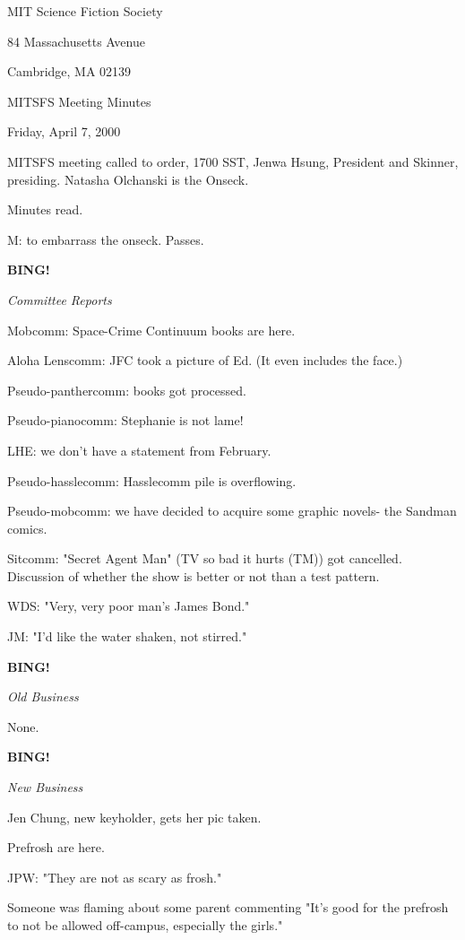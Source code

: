 \documentclass[12pt]{article}
\newcommand{\bing}{{\bf BING!} }
\newcommand{\goto}[1]{\bing \vskip 12pt \centerline{{\em{#1}}}}
\begin{document}
\begin{center}

MIT Science Fiction Society 

84 Massachusetts Avenue

Cambridge, MA 02139

\vspace{12pt}

MITSFS Meeting Minutes 

Friday, April 7, 2000

\end{center}
 
\vspace{18pt}

\setlength{\parskip}{6pt}

\noindent
MITSFS meeting called to order, 1700 SST, Jenwa Hsung, President and
Skinner, presiding.  Natasha Olchanski is the Onseck.

Minutes read.

M: to embarrass the onseck. Passes.

\goto{Committee Reports}

Mobcomm: Space-Crime Continuum books are here.

Aloha Lenscomm: JFC took a picture of Ed. (It even includes the face.)

Pseudo-panthercomm: books got processed.

Pseudo-pianocomm: Stephanie is not lame!

LHE: we don't have a statement from February.

Pseudo-hasslecomm: Hasslecomm pile is overflowing.

Pseudo-mobcomm: we have decided to acquire some graphic novels- the Sandman comics.

Sitcomm: "Secret Agent Man" (TV so bad it hurts (TM)) got cancelled. Discussion of whether the show is better or not than a test pattern.

WDS: "Very, very poor man's James Bond."

JM: "I'd like the water shaken, not stirred."

\goto{Old Business}

None.

\goto{New Business}

Jen Chung, new keyholder, gets her pic taken.

Prefrosh are here.

JPW: "They are not as scary as frosh."

Someone was flaming about some parent commenting "It's good for the prefrosh to not be allowed off-campus, especially the girls."
\end{document}
